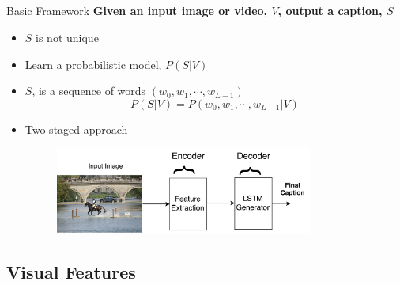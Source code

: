 \documentclass{beamer}
\begin{document}
\subsection{}
\begin{frame}{Basic Framework}
\textbf{Given an input image or video, $V$, output a caption, $S$}
\begin{itemize}
\item $S$ is not unique
\item Learn a probabilistic model, $P(S|V)$
\item $S$, is a sequence of words $(w_0, w_1,\cdots, w_{L-1})$
\begin{equation}
\label{eq:langB1} P(S|V) = P(w_0, w_1, \cdots, w_{L-1}|V)
\end{equation}
\item Two-staged approach
    {
        \begin{figure}[h]
            \centering
            \includegraphics[width=0.8\textwidth]{images/EncDec.pdf}
        \end{figure}
     }
\end{itemize} 
\end{frame}
\subsection{Visual Features}
\end{document}

